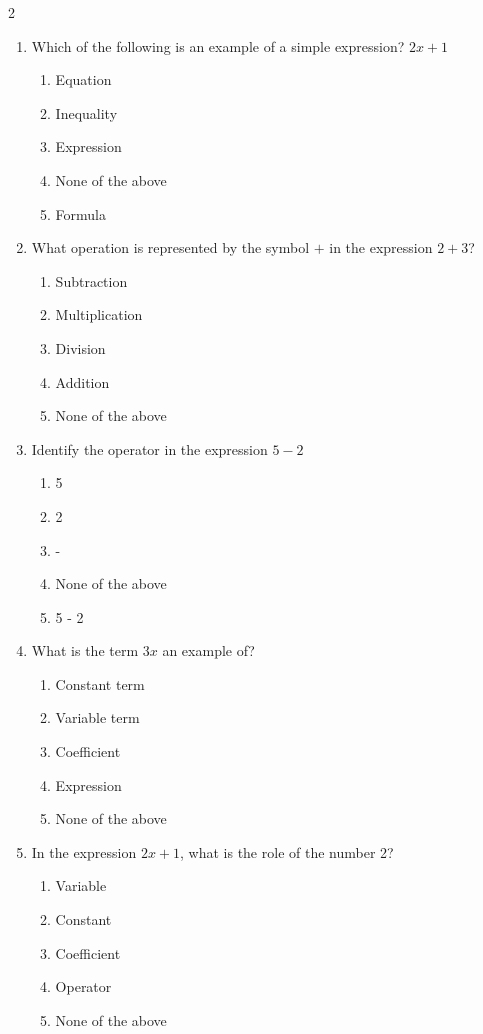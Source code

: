 \documentclass[10pt]{article}
\begin{document}
\begin{multicols}{2}
\begin{enumerate}[label=\textbf{Q\arabic*.}, leftmargin=*, itemsep=6pt, parsep=0pt]
  \item \small Which of the following is an example of a simple expression? $2x + 1$
  \begin{enumerate}[label=(\Alph*), leftmargin=0.6cm, nosep, itemsep=2pt]
    \item Equation
    \item Inequality
    \item Expression
    \item None of the above
    \item Formula
  \end{enumerate}

  \item \small What operation is represented by the symbol $+$ in the expression $2 + 3$?
  \begin{enumerate}[label=(\Alph*), leftmargin=0.6cm, nosep, itemsep=2pt]
    \item Subtraction
    \item Multiplication
    \item Division
    \item Addition
    \item None of the above
  \end{enumerate}

  \item \small Identify the operator in the expression $5 - 2$
  \begin{enumerate}[label=(\Alph*), leftmargin=0.6cm, nosep, itemsep=2pt]
    \item 5
    \item 2
    \item -
    \item None of the above
    \item 5 - 2
  \end{enumerate}

  \item \small What is the term $3x$ an example of?
  \begin{enumerate}[label=(\Alph*), leftmargin=0.6cm, nosep, itemsep=2pt]
    \item Constant term
    \item Variable term
    \item Coefficient
    \item Expression
    \item None of the above
  \end{enumerate}

  \item \small In the expression $2x + 1$, what is the role of the number 2?
  \begin{enumerate}[label=(\Alph*), leftmargin=0.6cm, nosep, itemsep=2pt]
    \item Variable
    \item Constant
    \item Coefficient
    \item Operator
    \item None of the above
  \end{enumerate}


\end{enumerate}
\end{multicols}
\end{document}
